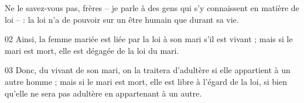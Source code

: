 Ne le savez-vous pas, frères – je parle à des gens qui s’y connaissent en matière de loi – : la loi n’a de pouvoir sur un être humain que durant sa vie.

02 Ainsi, la femme mariée est liée par la loi à son mari s’il est vivant ; mais si le mari est mort, elle est dégagée de la loi du mari.

03 Donc, du vivant de son mari, on la traitera d’adultère si elle appartient à un autre homme ; mais si le mari est mort, elle est libre à l’égard de la loi, si bien qu’elle ne sera pas adultère en appartenant à un autre.
